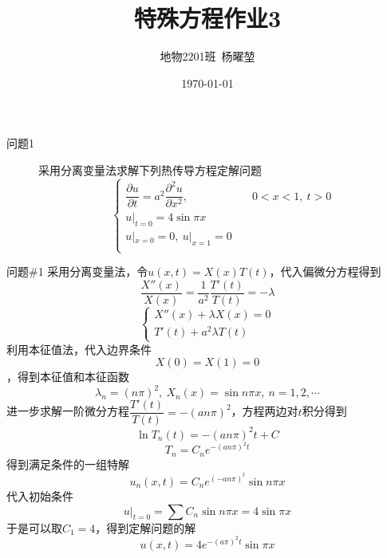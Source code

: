 \documentclass[12pt]{ctexart}
\title{特殊方程作业3}
\author{地物2201班\ 杨曜堃}
\date{\today}
\begin{document}
    \markboth{\theauthor}{\thetitle}
    \maketitle
    \begin{description}
        \item[问题1] 采用分离变量法求解下列热传导方程定解问题$$
        \begin{cases}
            \dfrac{\partial u}{\partial t}=a^2\dfrac{\partial^2u}{\partial x^2},&\quad 0<x<1,\ t>0\\
            u|_{t=0}=4\sin \pi x& \\
            u|_{x=0}=0,\ u|_{x=1}=0& \\
        \end{cases}$$
    \end{description}
    
    \begin{problem}{问题\#1}
        采用分离变量法，令$u(x,t)=X(x)T(t)$，代入偏微分方程得到
        $$
        \dfrac{X''(x)}{X(x)}=\dfrac{1}{a^2}\dfrac{T'(t)}{T(t)}=-\lambda
        $$
        $$
        \begin{cases}
            X''(x)+\lambda X(x)=0\\
            T'(t)+a^2\lambda T(t)
        \end{cases}
        $$
        利用本征值法，代入边界条件$$X(0)=X(1)=0$$，得到本征值和本征函数
        $$
        \lambda_n=(n\pi)^2,\ X_n(x)=\sin n\pi x,\ n=1,2,\cdots
        $$
        进一步求解一阶微分方程$\dfrac{T'(t)}{T(t)}=-(an\pi)^2$，方程两边对$t$积分得到
        $$
        \ln T_n(t)=-(an\pi)^2t+C
        $$
        $$
        T_n=C_ne^{-(an\pi)^2t}
        $$
        得到满足条件的一组特解
        $$
        u_n(x,t)=C_ne^{(-an\pi)^t}\sin n\pi x
        $$
        代入初始条件
        $$
        u|_{t=0}=\sum C_n\sin n\pi x=4\sin \pi x
        $$
        于是可以取$C_1=4$，得到定解问题的解
        $$
        u(x,t)=4e^{-(a\pi)^2t}\sin \pi x
        $$
    \end{problem}
\end{document}
